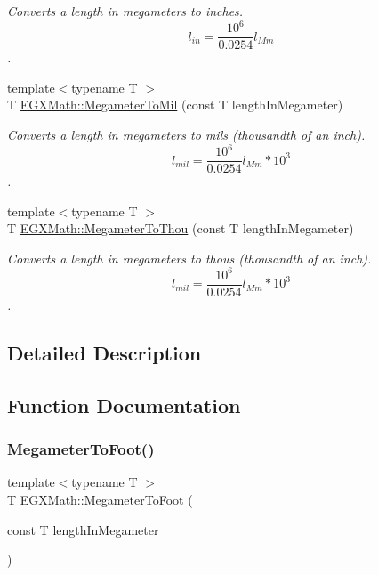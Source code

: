\begin{DoxyCompactItemize}
\begin{DoxyCompactList}\small\item\em Converts a length in megameters to inches. \[ l_{in}= \frac{10^{6}}{0.0254} l_{Mm} \]. \end{DoxyCompactList}\item 
{\footnotesize template$<$typename T $>$ }\\T \mbox{\hyperlink{group___e_g_x_math-_conversions-_length_conversions-_s_i-_megameter-_imperial_ga9494edd6659b7f69549d4fe96b9e2f98}{E\+G\+X\+Math\+::\+Megameter\+To\+Mil}} (const T length\+In\+Megameter)
\begin{DoxyCompactList}\small\item\em Converts a length in megameters to mils (thousandth of an inch). \[ l_{mil}= \frac{10^{6}}{0.0254} l_{Mm} * 10^{3} \]. \end{DoxyCompactList}\item 
{\footnotesize template$<$typename T $>$ }\\T \mbox{\hyperlink{group___e_g_x_math-_conversions-_length_conversions-_s_i-_megameter-_imperial_gae791a30b052a322fff88090e90fe32b5}{E\+G\+X\+Math\+::\+Megameter\+To\+Thou}} (const T length\+In\+Megameter)
\begin{DoxyCompactList}\small\item\em Converts a length in megameters to thous (thousandth of an inch). \[ l_{mil}= \frac{10^{6}}{0.0254} l_{Mm} * 10^{3} \]. \end{DoxyCompactList}\end{DoxyCompactItemize}


\subsection{Detailed Description}


\subsection{Function Documentation}
\mbox{\label{group___e_g_x_math-_conversions-_length_conversions-_s_i-_megameter-_imperial_ga5586abd81d8635465b9be7f9be5fadc7}} 
\subsubsection{\texorpdfstring{Megameter\+To\+Foot()}{MegameterToFoot()}}
{\footnotesize\ttfamily template$<$typename T $>$ \\
T E\+G\+X\+Math\+::\+Megameter\+To\+Foot (\begin{DoxyParamCaption}\item[{const T}]{length\+In\+Megameter }\end{DoxyParamCaption})}



